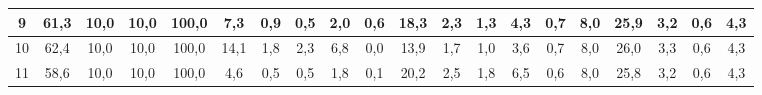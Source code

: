 \begin{sidewaystable}[]
\begin{tabular}{|c|c|c|c|c|c|c|c|c|c|c|c|c|c|c|c|c|c|c|c|}
    9  & 61,3                                            & 10,0                                            & 10,0                                            & 100,0                                           & 7,3                                             & 0,9                                             & 0,5                                             & 2,0                                             & 0,6                                             & 18,3                                             & 2,3                                              & 1,3                                              & 4,3                                              & 0,7                                              & 8,0                                              & 25,9                                             & 3,2                                              & 0,6                                              & 4,3                                              \\ \hline
    10 & 62,4                                            & 10,0                                            & 10,0                                            & 100,0                                           & 14,1                                            & 1,8                                             & 2,3                                             & 6,8                                             & 0,0                                             & 13,9                                             & 1,7                                              & 1,0                                              & 3,6                                              & 0,7                                              & 8,0                                              & 26,0                                             & 3,3                                              & 0,6                                              & 4,3                                              \\ \hline
    11 & 58,6                                            & 10,0                                            & 10,0                                            & 100,0                                           & 4,6                                             & 0,5                                             & 0,5                                             & 1,8                                             & 0,1                                             & 20,2                                             & 2,5                                              & 1,8                                              & 6,5                                              & 0,6                                              & 8,0                                              & 25,8                                             & 3,2                                              & 0,6                                              & 4,3                                              \\ \hline

\end{tabular}
\end{sidewaystable}
